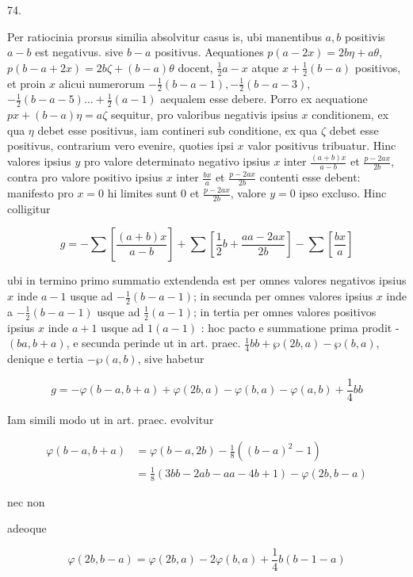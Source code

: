 \documentclass[10pt]{article}
\begin{document}
74.

Per ratiocinia prorsus similia absolvitur casus is, ubi manentibus \(a, b\) positivis \(a-b\) est negativus. sive \(b-a\) positivus. Aequationes \(p(a-2 x)=2 b \eta+a \theta\), \(p(b-a+2 x)=2 b \zeta+(b-a) \theta\) docent, \(\frac{1}{2} a-x\) atque \(x+\frac{1}{2}(b-a)\) positivos, et proin \(x\) alicui numerorum \(-\frac{1}{2}(b-a-1),-\frac{1}{2}(b-a-3)\), \(-\frac{1}{2}(b-a-5) \ldots+\frac{1}{2}(a-1)\) aequalem esse debere. Porro ex aequatione \(p x+(b-a) \eta=a \zeta\) sequitur, pro valoribus negativis ipsius \(x\) conditionem, ex qua \(\eta\) debet esse positivus, iam contineri sub conditione, ex qua \(\zeta\) debet esse positivus, contrarium vero evenire, quoties ipsi \(x\) valor positivus tribuatur. Hinc valores ipsius \(y\) pro valore determinato negativo ipsius \(x\) inter \(\frac{(a+b) x}{a-b}\) et \(\frac{p-2 a x}{2 b}\), contra pro valore positivo ipsius \(x\) inter \(\frac{b x}{a}\) et \(\frac{p-2 a x}{2 b}\) contenti esse debent: manifesto pro \(x=0\) hi limites sunt 0 et \(\frac{p-2 a x}{2 b}\), valore \(y=0\) ipso excluso. Hinc colligitur

\[
g=-\sum\left[\frac{(a+b) x}{a-b}\right]+\sum\left[\frac{1}{2} b+\frac{a a-2 a x}{2 b}\right]-\sum\left[\frac{b x}{a}\right]
\]

ubi in termino primo summatio extendenda est per omnes valores negativos ipsius \(x\) inde \(a-1\) usque ad \(-\frac{1}{2}(b-a-1)\); in secunda per omnes valores ipsius \(x\) inde a \(-\frac{1}{2}(b-a-1)\) usque ad \(\frac{1}{2}(a-1)\); in tertia per omnes valores positivos ipsius \(x\) inde \(a+1\) usque ad \(1(a-1)\) : hoc pacto e summatione prima prodit - \((b a, b+a)\), e secunda perinde ut in art. praec. \(\frac{1}{4} b b+\wp(2 b, a)-\wp(b, a)\), denique e tertia \(-\wp(a, b)\), sive habetur

\[
g=-\varphi(b-a, b+a)+\varphi(2 b, a)-\varphi(b, a)-\varphi(a, b)+\frac{1}{4} b b
\]

Iam simili modo ut in art. praec. evolvitur

\[
\begin{aligned}
\varphi(b-a, b+a) & =\varphi(b-a, 2 b)-\frac{1}{8}\left((b-a)^{2}-1\right) \\
& =\frac{1}{8}(3 b b-2 a b-a a-4 b+1)-\varphi(2 b, b-a)
\end{aligned}
\]

nec non

adeoque

\[
\varphi(2 b, b-a)=\varphi(2 b, a)-2 \varphi(b, a)+\frac{1}{4} b(b-1-a)
\]
\end{document}
